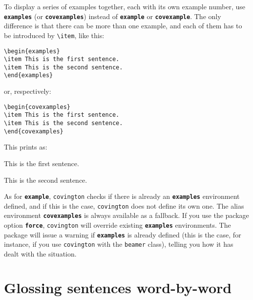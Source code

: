 \documentclass[english]{article}
\newcommand*\jenv[1]{\textbf{\texttt{#1}}}
\newcommand*\joption[1]{\textbf{\texttt{#1}}}
\newcommand*\jfmacro[1]{\texttt{#1}}
\newcommand*\jfcsmacro[1]{\jfmacro{\textbackslash{#1}}}
\begin{document}
To display a series of examples together, each with its own example 
number, use \jenv{examples} (or \jenv{covexamples}) instead of \jenv{example} or \jenv{covexample}.  The only 
difference is that there can be more than one example, and each of them 
has to be introduced by \jfcsmacro{item}, like this:
\begin{lstlisting}
\begin{examples}
\item This is the first sentence.
\item This is the second sentence.
\end{examples}
\end{lstlisting}
or, respectively:
\begin{lstlisting}
\begin{covexamples}
\item This is the first sentence.
\item This is the second sentence.
\end{covexamples}
\end{lstlisting}
This prints as:
\begin{examples}
\item This is the first sentence.
\item This is the second sentence.
\end{examples}
As for \jenv{example}, \texttt{covington} checks if there is already an \jenv{examples} environment defined, and if this is the case, \texttt{covington} does not define its own one. The alias environment \jenv{covexamples} is always available as a fallback. If you use the package option \joption{force}, \texttt{covington} will override existing \jenv{examples} environments. The package will issue a warning if \jenv{examples} is already defined (this is the case, for instance, if you use \texttt{covington} with the \texttt{beamer} class), telling you how it has dealt with the situation.


\section{Glossing sentences word-by-word}
\end{document}

